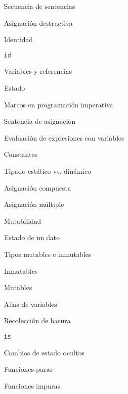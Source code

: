 \begin{longenum}
\begin{longenum}
\begin{longenum}
            \item Secuencia de sentencias
        \end{longenum}
        \item Asignación destructiva
        \begin{longenum}
            \item Identidad
            \begin{longenum}
                \item \texttt{id}
            \end{longenum}
            \item Variables y referencias
            \item Estado
            \item Marcos en programación imperativa
            \item Sentencia de asignación
            \item Evaluación de expresiones con variables
            \item Constantes
            \item Tipado estático vs. dinámico
            \item Asignación compuesta
            \item Asignación múltiple
        \end{longenum}
        \item Mutabilidad
        \begin{longenum}
            \item Estado de un dato
            \item Tipos mutables e inmutables
            \begin{longenum}
                \item Inmutables
                \item Mutables
            \end{longenum}
            \item Alias de variables
            \begin{longenum}
                \item Recolección de basura
                \item \texttt{is}
            \end{longenum}
        \end{longenum}
        \item Cambios de estado ocultos
        \begin{longenum}
            \item Funciones puras
            \item Funciones impuras

\end{longenum}
\end{longenum}
\end{longenum}

